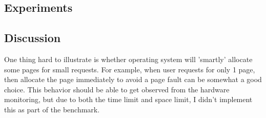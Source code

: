 \subsection{Experiments}




\subsection{Discussion}
One thing hard to illustrate is whether operating system will 'smartly'
allocate some pages for small requests. For example, when user requests for
only 1 page, then allocate the page immediately to avoid a page fault can be
somewhat a good choice. This behavior should be able to get observed from
the hardware monitoring, but due to both the time limit and space limit, I
didn't implement this as part of the benchmark.
